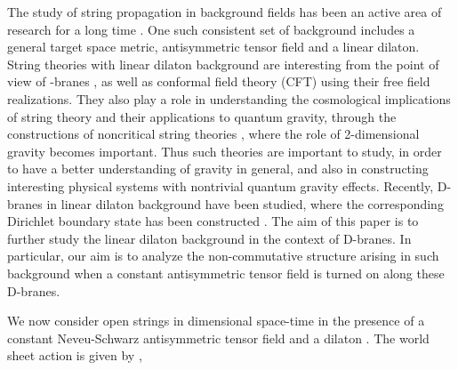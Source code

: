 \documentclass[a4paper,12pt]{article}
\begin{document}
\newpage

The study of string propagation in background fields has been an active
area of research for a long time \cite{friedan}. One such consistent 
set of background includes a general target space metric, antisymmetric 
tensor field and a linear dilaton. String theories with linear dilaton 
background \cite{myers} are interesting from the point of view of 
\coordHE{}-branes \cite{li,rajaraman}, as well as conformal 
field theory (CFT) using their free field realizations. 
They also play a role in understanding the cosmological implications  
of string theory\cite{bachas} and their applications to 
quantum gravity, through the constructions of 
noncritical string theories \cite{sasha,marn,david,DK,nati}, 
where the role of 2-dimensional gravity  becomes important. 
Thus such theories are important to study, in order to have a better
understanding of gravity in general, and also in constructing interesting 
physical systems with nontrivial 
quantum gravity effects. Recently, D-branes in linear dilaton background
have been studied, where the corresponding Dirichlet boundary state 
has been constructed \cite{li,rajaraman}. 
The aim of this paper is to further study the linear 
dilaton background in the context of D-branes. In particular, our aim 
is to analyze the non-commutative structure \cite{SW} 
arising in such background when a constant antisymmetric tensor field
is turned on along these D-branes.

We now consider open strings in \coordHE{} dimensional space-time in the 
presence of a constant Neveu-Schwarz antisymmetric tensor field
\coordHE{} and a dilaton \myHighlight{$\Phi$}\coordHE{}. The world sheet action is given by 
\cite{callan},
\end{document}
